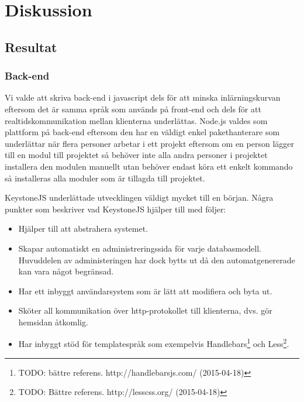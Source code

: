 \documentclass{article}
\begin{document}

\clearpage

\clearpage

\section{Diskussion}

\subsection{Resultat}

\subsubsection{Back-end}
Vi valde att skriva back-end i javascript dels för att minska inlärningskurvan eftersom det är samma språk som används på front-end och dels för att realtidskommunikation mellan klienterna underlättas. Node.js valdes som plattform på back-end eftersom den har en väldigt enkel pakethanterare som underlättar när flera personer arbetar i ett projekt eftersom om en person lägger till en modul till projektet så behöver inte alla andra personer i projektet installera den modulen manuellt utan behöver endast köra ett enkelt kommando så installeras alla moduler som är tillagda till projektet.

KeystoneJS underlättade utvecklingen väldigt mycket till en början. Några punkter som beskriver vad KeystoneJS hjälper till med följer:

  \begin{itemize}
    \item Hjälper till att abstrahera systemet.
    \item Skapar automatiskt en administreringssida för varje databasmodell.
      Huvuddelen av administeringen har dock bytts ut då den automatgenererade kan vara något begränsad.
    \item Har ett inbyggt användarsystem som är lätt att modifiera och byta ut.
    \item Sköter all kommunikation över http-protokollet till klienterna, dvs. gör hemsidan åtkomlig.
    \item Har inbyggt stöd för templatespråk som exempelvis Handlebars\footnote{TODO: bättre referens. http://handlebarsjs.com/ (2015-04-18)} och Less\footnote{TODO: Bättre referens. http://lesscss.org/ (2015-04-18)}.
  \end{itemize}
  
\end{document}
